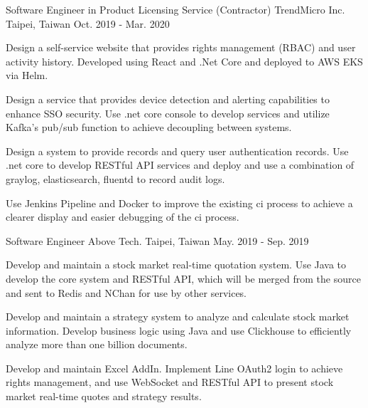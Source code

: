 \begin{cventries}
\cventry
{Software Engineer in Product Licensing Service (Contractor)} %
{TrendMicro Inc.} %
{Taipei, Taiwan} %
{Oct. 2019 - Mar. 2020} %
{
  \begin{cvitems} %
    \item {Design a self-service website that provides rights management (RBAC) and user activity history. Developed using React and .Net Core and deployed to AWS EKS via Helm.}
    \item {Design a service that provides device detection and alerting capabilities to enhance SSO security. Use .net core console to develop services and utilize Kafka's pub/sub function to achieve decoupling between systems.}
    \item {Design a system to provide records and query user authentication records. Use .net core to develop RESTful API services and deploy and use a combination of graylog, elasticsearch, fluentd to record audit logs.}
    \item {Use Jenkins Pipeline and Docker to improve the existing ci process to achieve a clearer display and easier debugging of the ci process.}
  \end{cvitems}
}

\cventry
{Software Engineer} %
{Above Tech.} %
{Taipei, Taiwan} %
{May. 2019 - Sep. 2019} %
{
  \begin{cvitems} %
    \item {Develop and maintain a stock market real-time quotation system. Use Java to develop the core system and RESTful API, which will be merged from the source and sent to Redis and NChan for use by other services.}
    \item {Develop and maintain a strategy system to analyze and calculate stock market information. Develop business logic using Java and use Clickhouse to efficiently analyze more than one billion documents.}
    \item {Develop and maintain Excel AddIn. Implement Line OAuth2 login to achieve rights management, and use WebSocket and RESTful API to present stock market real-time quotes and strategy results.}
  \end{cvitems}
}


\end{cventries}

